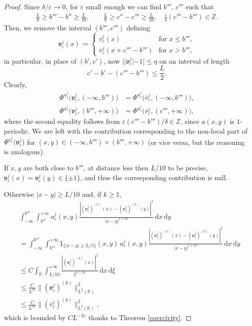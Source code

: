 \documentclass{article}
\theoremstyle{definition}
\newcommand{\abs}[1]{\left|#1\right|}
\newcommand{\de}{\mathrm{d}}
\newcommand{\R}{\mathbb{R}}
\newcommand{\e}{\varepsilon}
\def\e{\varepsilon}
\begin{document}
\begin{proof}
    Since $\delta/\e \to 0$, for $\e$ small enough we can find $b'''$, $c'''$ such that
\begin{equation*}
    \begin{split}
     \frac{L}{8} \geq b'''-b''\geq \frac{L}{10}, \qquad \frac{L}{8} \geq c''-c'''\geq \frac{L}{10},\quad     \frac{\e}{\delta}(c'''-b''')\in \mathbb Z.
    \end{split}
\end{equation*}
Then, we remove the interval $(b''',c''')$ defining
    \[
    \mathfrak{v}_\e^{j}(x) \coloneqq 
    \begin{cases}
        \overline{v}_\e^{j}(x) & \text{for } x\leq b''',\\
        \overline{v}_\e^{j}(x+c'''-b''') & \text{for } x > b''',
    \end{cases}
    \]
    in particular, in place of $(b',c')$, now $||\mathfrak{v}_\e^{j}|-1|\leq \eta$ on an interval of length 
    \[c'-b'-(c'''-b''')\leq \frac{L}{2}.\]
    Clearly,
    \[\begin{split}
        \Phi^{a^{j}_{\scriptstyle\e}}\big( \mathfrak{v}_\e^{j},(-\infty, b''')\big) &= \Phi^{a^{j}_{\scriptstyle\e}}\big(\overline{v}_\e^{j},(-\infty,b''')\big),\\
        \Phi^{a^{j}_{\scriptstyle\e}}\big( \mathfrak{v}_\e^{j},(b''',+\infty)\big) &= \Phi^{a^{j}_{\scriptstyle\e}}\big(\overline{v}_\e^{j},(c''',+\infty)\big),
    \end{split}\]
    where the second equality follows from $ \e(c'''-b''')/\delta \in \mathbb Z$, since $a(x,y)$ is $1$-periodic. We are left with the contribution corresponding to the non-local part of $\Phi^{a^{j}_{\scriptstyle\e}}\big( \mathfrak{v}_\e^{j})$ for  $(x,y)\in (-\infty, b''')\times(b''',+\infty)$ (or vice versa, but the reasoning is analogous).
    
    If $x,y$ are both close to $b'''$, at distance less then $L/10$ to be precise, $\mathfrak{v}_\e^{j}(x)=\mathfrak{v}_\e^{j}(y)\in\{\pm 1\}$, and thus the corresponding contribution is null. 
    
    Otherwise $|x-y|\geq L/10$ and, if $k\geq 1$,
    \[\begin{split}
       & \int_{-\infty}^{b'''}\int_{b'''}^{+\infty} a_\e^j(x,y) \frac{\abs{(\mathfrak{v}_\e^j)^{(k)}(x)-(\mathfrak{v}_\e^j)^{(k)}(y)}^2}{|x-y|^{1+2s}}\,\de x\,\de y\\
       &=\int_{-\infty}^{b'''}\int_{b'''}^{+\infty}\mathsf{1}_{\{|x-y|\geq L/5\}}(x,y)\, a_\e^j(x,y) \frac{\abs{(\mathfrak{v}_\e^j)^{(k)}(x)-(\mathfrak{v}_\e^j)^{(k)}(y)}^2}{|x-y|^{1+2s}}\,\de x\,\de y\\
       &\leq C \int_{\R}\int_{L/10}^{+\infty} \frac{\abs{(\mathfrak{v}_\e^j)^{(k)}(x)}^2}{\xi^{1+2s}}\,\de x\,\de \xi \\
       &\leq \frac{C}{L^{2s}}\|(\mathfrak{v}_\e^j)^{(k)}\|^2_{L^2(\R)} \\
       &\leq \frac{C}{L^{2s} }\|(\overline{v}^j_\e)^{(k)}\|^2_{L^2(\R)},
    \end{split}\]
    which is bounded by $C L^{-2s}$ thanks to Theorem \ref{coercivity}.
    

\end{proof}
\end{document}
